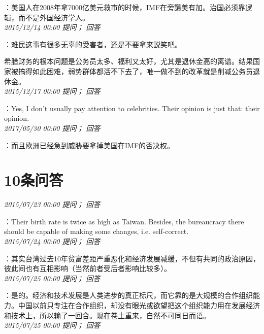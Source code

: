 \documentclass[twocolumn]{ctexart}
\begin{document}
：美国人在2008年拿7000亿美元救市的时候，IMF在旁讚美有加。治国必须靠逻辑，而不是外国经济学人。\\

\textit{\hfill\noindent\small 2015/12/14 00:00 提问； 回答}

：难民这事有很多无辜的受害者，还是不要拿来説笑吧。

希腊财务的根本问题是公务员太多、福利又太好，尤其是退休金高的离谱。结果国家被搞得如此困难，弱势群体都活不下去了，唯一做不到的改革就是削减公务员退休金。\\

\textit{\hfill\noindent\small 2015/12/17 00:00 提问； 回答}

：Yes, I don't usually pay attention to celebrities. Their opinion is just that: their opinion.\\

\textit{\hfill\noindent\small 2017/05/30 00:00 提问； 回答}

：而且欧洲已经急到威胁要拿掉美国在IMF的否决权。\\

\section{10条问答}

\textit{\hfill\noindent\small 2015/07/23 00:00 提问； 回答}

：Their birth rate is twice as high as Taiwan. Besides, the bureaucracy there should be capable of making some changes, i.e. self-correct.\\

\textit{\hfill\noindent\small 2015/07/24 00:00 提问； 回答}

：其实台湾过去10年贫富差距严重恶化和经济发展减缓，不但有共同的政治原因，彼此间也有互相影响（当然前者受后者影响比较多）。\\

\textit{\hfill\noindent\small 2015/07/25 00:00 提问； 回答}

：是的。经济和技术发展是人类进步的真正标尺，而它靠的是大规模的合作组织能力。中国以前只专注在合作组织，却没有眼光或欲望把这个组织能力用在发展经济和技术上，所以输了一回合。现在卷土重来，自然不可同日而语。\\

\textit{\hfill\noindent\small 2015/07/25 00:00 提问； 回答}
\end{document}
